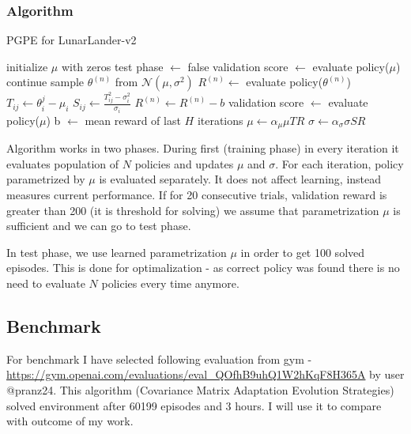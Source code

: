 \documentclass[12pt]{article}
\begin{document}
\subsubsection{Algorithm}

\begin{algorithm}
\caption{PGPE for LunarLander-v2}
\begin{algorithmic}[1]
\State initialize $\mu$ with zeros
\State test phase $\gets$ false
		\State validation score $\gets$ evaluate policy($\mu$)
		\State continue
	\EndIf
		\State sample $\theta^{(n)}$ from $\mathcal{N}(\mu, \sigma^2)$
	\State $R^{(n)} \gets$ evaluate policy($\theta^{(n)}$)
	\EndFor
	\State $T_{ij} \gets \theta_i^{j} - \mu_i$
	\State $S_{ij} \gets \frac{T_{ij}^2 - \sigma_i^2}{\sigma_i}$
	\State $R^{(n)} \gets R^{(n)} - b$
	\State validation score $\gets$ evaluate policy($\mu$)
	\State b $\gets$ mean reward of last $H$ iterations
	\EndIf
	\State $\mu \gets \alpha_\mu \mu TR$
	\State $\sigma \gets \alpha_\sigma \sigma SR$
\EndWhile

\end{algorithmic}
\end{algorithm}

Algorithm works in two phases. During first (training phase) in every iteration it evaluates population of $N$ policies and updates $\mu$ and $\sigma$. For each iteration, policy parametrized by $\mu$ is evaluated separately. It does not affect learning, instead measures current performance. If for 20 consecutive trials, validation reward is greater than 200 (it is threshold for solving) we assume that parametrization $\mu$ is sufficient and we can go to test phase.

In test phase, we use learned parametrization $\mu$ in order to get 100 solved episodes. This is done for optimalization - as correct policy was found there is no need to evaluate $N$ policies every time anymore.


\subsection{Benchmark}

For benchmark I have selected following evaluation from gym - \url{https://gym.openai.com/evaluations/eval_QOfhB9uhQ1W2hKqF8H365A} by user @pranz24. This algorithm (Covariance Matrix Adaptation Evolution Strategies) solved environment after 60199 episodes and 3 hours. I will use it to compare with outcome of my work.
\end{document}
